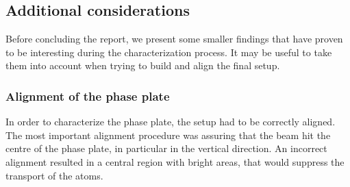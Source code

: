 \subsection{Additional considerations}
Before concluding the report, we present some smaller findings that have proven to be interesting during the characterization process. It may be useful to take them into account when trying to build and align the final setup.

\subsubsection{Alignment of the phase plate}
In order to characterize the phase plate, the setup had to be correctly aligned. The most important alignment procedure was assuring that the beam hit the centre of the phase plate, in particular in the vertical direction. An incorrect alignment resulted in a central region with bright areas, that would suppress the transport of the atoms.

